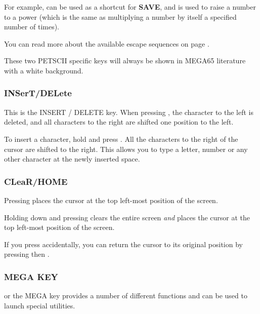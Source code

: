 For example, \megakeywhite{$\leftarrow$} can be used as a shortcut for {\bf SAVE}, and \megakeywhite{$\uparrow$}
is used to raise a number to a power (which is the same as multiplying a number by itself a specified number of times).

You can read more about the available escape sequences on page \pageref{escape-sequences}.

These two PETSCII specific keys will always be shown in MEGA65 literature with a white background.

\subsubsection{INSerT/DELete}
This is the INSERT / DELETE key. When pressing , the character to the left is deleted, and all characters to the right are shifted one position to the left.

To insert a character, hold  and press . All the characters to the right of the cursor are shifted to the right. This allows you to type a letter, number or any other character at the newly inserted space.


\subsubsection{CLeaR/HOME}
Pressing  places the cursor at the top left-most position of the screen.

Holding down  and pressing  clears the entire screen {\it and} places the cursor at the top left-most position of the screen.

If you press  accidentally, you can return the cursor to its original position by pressing  then .

\subsubsection{MEGA KEY}
\megasymbolkey or the MEGA key provides a number of different functions and can be used to launch special utilities.


